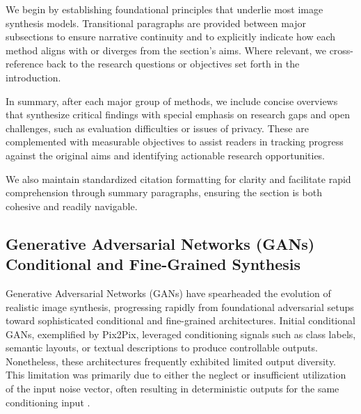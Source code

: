 \documentclass[sigconf]{acmart}
\begin{document}
We begin by establishing foundational principles that underlie most image synthesis models. Transitional paragraphs are provided between major subsections to ensure narrative continuity and to explicitly indicate how each method aligns with or diverges from the section's aims. Where relevant, we cross-reference back to the research questions or objectives set forth in the introduction.

In summary, after each major group of methods, we include concise overviews that synthesize critical findings with special emphasis on research gaps and open challenges, such as evaluation difficulties or issues of privacy. These are complemented with measurable objectives to assist readers in tracking progress against the original aims and identifying actionable research opportunities.

We also maintain standardized citation formatting for clarity and facilitate rapid comprehension through summary paragraphs, ensuring the section is both cohesive and readily navigable.

\subsection{Generative Adversarial Networks (GANs) Conditional and Fine-Grained Synthesis}

Generative Adversarial Networks (GANs) have spearheaded the evolution of realistic image synthesis, progressing rapidly from foundational adversarial setups toward sophisticated conditional and fine-grained architectures. Initial conditional GANs, exemplified by Pix2Pix, leveraged conditioning signals such as class labels, semantic layouts, or textual descriptions to produce controllable outputs. Nonetheless, these architectures frequently exhibited limited output diversity. This limitation was primarily due to either the neglect or insufficient utilization of the input noise vector, often resulting in deterministic outputs for the same conditioning input \cite{ref93,ref95}.
\end{document}

